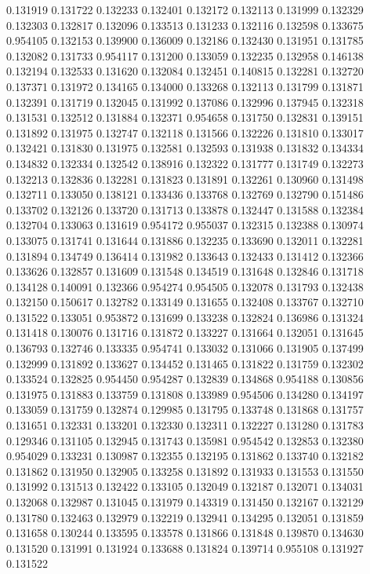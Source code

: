 0.131919
0.131722
0.132233
0.132401
0.132172
0.132113
0.131999
0.132329
0.132303
0.132817
0.132096
0.133513
0.131233
0.132116
0.132598
0.133675
0.954105
0.132153
0.139900
0.136009
0.132186
0.132430
0.131951
0.131785
0.132082
0.131733
0.954117
0.131200
0.133059
0.132235
0.132958
0.146138
0.132194
0.132533
0.131620
0.132084
0.132451
0.140815
0.132281
0.132720
0.137371
0.131972
0.134165
0.134000
0.133268
0.132113
0.131799
0.131871
0.132391
0.131719
0.132045
0.131992
0.137086
0.132996
0.137945
0.132318
0.131531
0.132512
0.131884
0.132371
0.954658
0.131750
0.132831
0.139151
0.131892
0.131975
0.132747
0.132118
0.131566
0.132226
0.131810
0.133017
0.132421
0.131830
0.131975
0.132581
0.132593
0.131938
0.131832
0.134334
0.134832
0.132334
0.132542
0.138916
0.132322
0.131777
0.131749
0.132273
0.132213
0.132836
0.132281
0.131823
0.131891
0.132261
0.130960
0.131498
0.132711
0.133050
0.138121
0.133436
0.133768
0.132769
0.132790
0.151486
0.133702
0.132126
0.133720
0.131713
0.133878
0.132447
0.131588
0.132384
0.132704
0.133063
0.131619
0.954172
0.955037
0.132315
0.132388
0.130974
0.133075
0.131741
0.131644
0.131886
0.132235
0.133690
0.132011
0.132281
0.131894
0.134749
0.136414
0.131982
0.133643
0.132433
0.131412
0.132366
0.133626
0.132857
0.131609
0.131548
0.134519
0.131648
0.132846
0.131718
0.134128
0.140091
0.132366
0.954274
0.954505
0.132078
0.131793
0.132438
0.132150
0.150617
0.132782
0.133149
0.131655
0.132408
0.133767
0.132710
0.131522
0.133051
0.953872
0.131699
0.133238
0.132824
0.136986
0.131324
0.131418
0.130076
0.131716
0.131872
0.133227
0.131664
0.132051
0.131645
0.136793
0.132746
0.133335
0.954741
0.133032
0.131066
0.131905
0.137499
0.132999
0.131892
0.133627
0.134452
0.131465
0.131822
0.131759
0.132302
0.133524
0.132825
0.954450
0.954287
0.132839
0.134868
0.954188
0.130856
0.131975
0.131883
0.133759
0.131808
0.133989
0.954506
0.134280
0.134197
0.133059
0.131759
0.132874
0.129985
0.131795
0.133748
0.131868
0.131757
0.131651
0.132331
0.133201
0.132330
0.132311
0.132227
0.131280
0.131783
0.129346
0.131105
0.132945
0.131743
0.135981
0.954542
0.132853
0.132380
0.954029
0.133231
0.130987
0.132355
0.132195
0.131862
0.133740
0.132182
0.131862
0.131950
0.132905
0.133258
0.131892
0.131933
0.131553
0.131550
0.131992
0.131513
0.132422
0.133105
0.132049
0.132187
0.132071
0.134031
0.132068
0.132987
0.131045
0.131979
0.143319
0.131450
0.132167
0.132129
0.131780
0.132463
0.132979
0.132219
0.132941
0.134295
0.132051
0.131859
0.131658
0.130244
0.133595
0.133578
0.131866
0.131848
0.139870
0.134630
0.131520
0.131991
0.131924
0.133688
0.131824
0.139714
0.955108
0.131927
0.131522
